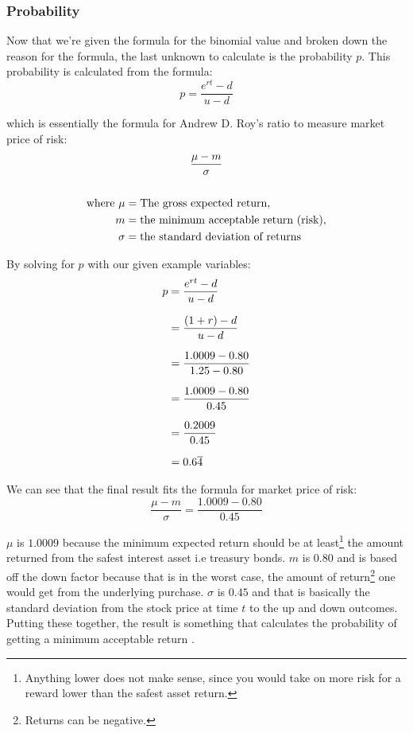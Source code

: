 \documentclass[12pt, letterpaper]{article}\usepackage{float}
\begin{document}
\subsubsection*{Probability}
Now that we're given the formula for the binomial value and broken down the reason for the formula, the last unknown to calculate is the probability ${p}$. This probability is calculated from the formula:
\begin{equation*}
  p = \frac{e^{rt} - d}{u - d}
\end{equation*}

\noindent which is essentially the formula for Andrew D. Roy's ratio \cite{riskneutralmeasurewikipedia, sharperatiowikipedia, royssafetyfirstcriterionwikipedia} to measure market price of risk:
\begin{gather}
  \setlength{\jot}{10pt}
  \frac{\mu - m}{\sigma} \\
  \\
  \begin{align*}
  \text{where}~\mu &= \text{The gross expected return}, \\
  m &= \text{the minimum acceptable return (risk)}, \\
  \sigma &= \text{the standard deviation of returns}
  \end{align*} \\
\end{gather}

\pagebreak
By solving for ${p}$ with our given example variables:
\begin{equation*}
  \setlength{\jot}{10pt}
  \begin{split}
    p
    & = \frac{e^{rt} - d}{u - d} \\
    & = \frac{(1+r) - d}{u - d} \\
    & = \frac{1.0009 - 0.80}{1.25 - 0.80} \\
    & = \frac{1.0009 - 0.80}{0.45} \\
    & = \frac{0.2009}{0.45} \\
    & = 0.6\overline{4}
  \end{split}
\end{equation*}

We can see that the final result fits the formula for market price of risk:
\begin{equation*}
  \frac{\mu - m}{\sigma} = \frac{1.0009 - 0.80}{0.45}
\end{equation*}

\noindent ${\mu}$ is ${1.0009}$ because the minimum expected return should be at least\footnote{Anything lower does not make sense, since you would take on more risk for a reward lower than the safest asset return.} the amount returned from the safest interest asset i.e treasury bonds. ${m}$ is ${0.80}$ and is based off the down factor because that is in the worst case, the amount of return\footnote{Returns can be negative.} one would get from the underlying purchase. ${\sigma}$ is ${0.45}$ and that is basically the standard deviation from the stock price at time ${t}$ to the up and down outcomes. Putting these together, the result is something that calculates the probability of getting a minimum acceptable return \cite{sfratioinvestopedia}.
\end{document}
